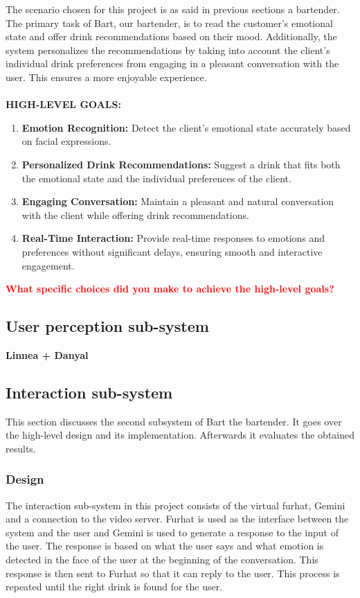 \documentclass[conference]{IEEEtran}
\begin{document}
The scenario chosen for this project is as said in previous sections a bartender. The primary task of Bart, our bartender, is to read the customer's emotional state and offer drink recommendations based on their mood. Additionally, the system personalizes the recommendations by taking into account the client's individual drink preferences from engaging in a pleasant conversation with the user. This ensures a more enjoyable experience. 
\\
\\
\textbf{HIGH-LEVEL GOALS:}
\\
\begin{enumerate}
    \item \textbf{Emotion Recognition:} Detect the client’s emotional state accurately based on facial expressions.
    \item \textbf{Personalized Drink Recommendations:} Suggest a drink that fits both the emotional state and the individual preferences of the client.
    \item \textbf{Engaging Conversation:} Maintain a pleasant and natural conversation with the client while offering drink recommendations.
    \item \textbf{Real-Time Interaction:} Provide real-time responses to emotions and preferences without significant delays, ensuring smooth and interactive engagement.
\\
\end{enumerate}

\textcolor{red}{\textbf{What specific choices did you make to achieve the high-level goals?}}




\subsection{User perception sub-system}
\textbf{Linnea + Danyal}

\subsection{Interaction sub-system} %
This section discusses the second subsystem of Bart the bartender. 
It goes over the high-level design and its implementation. 
Afterwards it evaluates the obtained results.

\subsubsection{Design}
The interaction sub-system in this project consists of the virtual furhat, Gemini and a connection to the video server.
Furhat is used as the interface between the system and the user and Gemini is used to generate a response to the input of the user.
The response is based on what the user says and what emotion is detected in the face of the user at the beginning of the conversation.
This response is then sent to Furhat so that it can reply to the user.
This process is repeated until the right drink is found for the user.
\end{document}
